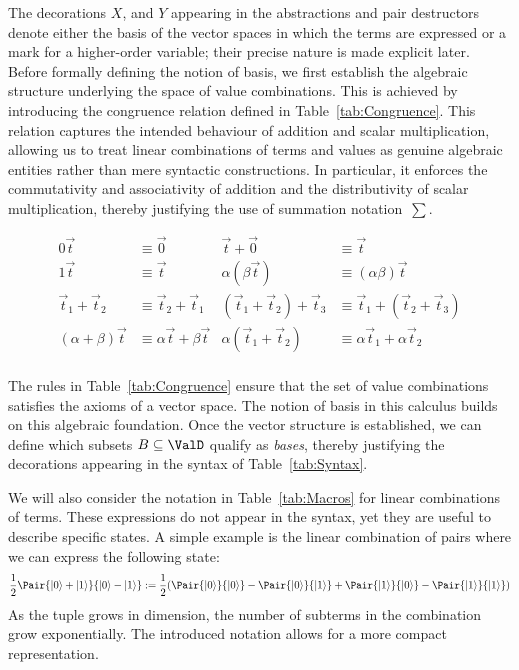 The decorations $X$, and $Y$ appearing in the abstractions and pair
destructors denote either the basis of the vector spaces in which the terms
are expressed or a mark for a higher-order variable; their precise nature is
made explicit later. Before formally defining the notion of basis, we first
establish the algebraic structure underlying the space of value combinations.
This is achieved by introducing the congruence relation defined in
Table~\ref{tab:Congruence}.
This relation captures the intended behaviour of addition and scalar
multiplication, allowing us to treat linear combinations of terms and values
as genuine algebraic entities rather than mere syntactic constructions.
In particular, it enforces the commutativity and associativity of addition and
the distributivity of scalar multiplication, thereby justifying the use of summation
notation~$\sum$.

\begin{table}[t]
  \begin{align*}
    0\vec t &\equiv \vec 0 & \vec t+\vec 0 &\equiv \vec t \\
    1\vec{t} &\equiv \vec{t} &
    \alpha(\beta\vec{t}) &\equiv (\alpha\beta)\vec{t} \\
    \vec{t}_{1}+\vec{t}_{2} &\equiv \vec{t}_{2}+\vec{t}_{1} &
    (\vec{t}_{1}+\vec{t}_{2})+\vec{t}_{3} &\equiv \vec{t}_{1}+(\vec{t}_{2}+\vec{t}_{3}) \\
    (\alpha+\beta)\vec{t} &\equiv \alpha\vec{t}+\beta\vec{t} &
    \alpha(\vec{t}_{1}+\vec{t}_{2}) &\equiv \alpha\vec{t}_{1}+\alpha\vec{t}_{2}\\
    \end{align*}
  \caption{Term congruence}
  \label{tab:Congruence}
\end{table}

The rules in Table~\ref{tab:Congruence} ensure that the set of value combinations
satisfies the axioms of a vector space. The notion of basis in this calculus builds
on this algebraic foundation. Once the vector structure is established, we can define
which subsets $B\subseteq \ValD$ qualify as \emph{bases}, thereby justifying the
decorations appearing in the syntax of Table~\ref{tab:Syntax}.

We will also consider the notation in Table~\ref{tab:Macros} for linear
combinations of terms. These expressions do not appear in the syntax,
yet they are useful to describe specific states. A simple example is the linear
combination of pairs where we can express the following state:
\[
\frac{1}{2}\Pair{\ket{0}+\ket{1}}{\ket{0}-\ket{1}} :=
\frac{1}{2}(\Pair{\ket{0}}{\ket{0}}- \Pair{\ket{0}}{\ket{1}}
+\Pair{\ket{1}}{\ket{0}}-\Pair{\ket{1}}{\ket{1}})
\]
As the tuple grows in dimension, the number of subterms in the combination grow
exponentially. The introduced notation allows for a more compact representation.

